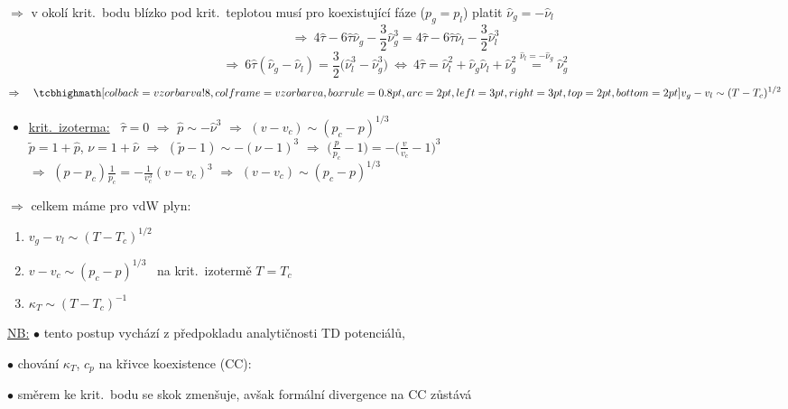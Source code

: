 $\Rightarrow$ v okolí krit.\ bodu blízko pod krit.\ teplotou musí pro koexistující fáze ($p_g = p_l$) platit $\hat\nu_g = -\hat\nu_l$
\[ \Rightarrow\ 4\hat\tau - 6\hat\tau\hat\nu_g - \frac32\hat\nu_g^3 = 4\hat\tau - 6\hat\tau\hat\nu_l - \frac32\hat\nu_l^3 \]
\[
  \Rightarrow\ 6\hat\tau(\hat\nu_g - \hat\nu_l) = \frac32\big(\hat\nu_l^3 - \hat\nu_g^3\big)
  \ \Leftrightarrow\ 4\hat\tau = \hat\nu_l^2 + \hat\nu_g\hat\nu_l + \hat\nu_g^2 \overset{\hat\nu_l = -\hat\nu_g}{=} \hat\nu_g^2
\]
\[ \Rightarrow\quad \vzorec{v_g - v_l \sim (T - T_c)^{1/2}} \]

\begin{itemize}
  \item \underline{krit.\ izoterma:} \ $\hat\tau = 0$ $\Rightarrow$ $\hat p\sim-\hat\nu^3$ $\Rightarrow$ $(v - v_c)\sim(p_c - p)^{1/3}$ \\
  {\small $\tilde p = 1 + \hat p$, $\nu = 1 + \hat\nu$ $\Rightarrow$ $(\tilde p - 1)\sim-(\nu - 1)^3$ $\Rightarrow$ $\big(\frac{p}{p_c} - 1\big) = -\big(\frac{v}{v_c} - 1\big)^3$ \\
  $\Rightarrow$ $(p - p_c)\frac1{p_c} = -\frac1{v_c^3}(v - v_c)^3$ $\Rightarrow$ $(v - v_c)\sim(p_c - p)^{1/3}$}
\end{itemize}

\begin{veta}
$\Rightarrow$ celkem máme pro vdW plyn:
\begin{enumerate}[label=\roman*),nosep]
  \item $v_g - v_l \sim (T - T_c)^{1/2}$
  \item $v - v_c \sim (p_c - p)^{1/3}$ \ na krit.\ izotermě $T = T_c$
  \item $\kappa_T \sim (T - T_c)^{-1}$
\end{enumerate}
\end{veta}

\underline{NB:} $\bullet$ tento postup vychází z předpokladu analytičnosti TD potenciálů, 

$\bullet$ chování $\kappa_T$, $c_p$ na křivce koexistence (CC):

\begin{center}
\hspace{0.6cm}
\begin{minipage}[b]{0.4\textwidth}
$\bullet$ směrem ke krit.\ bodu se skok zmenšuje, avšak formální divergence na CC zůstává
\vspace{0.8cm}
\end{minipage}
\end{center}

